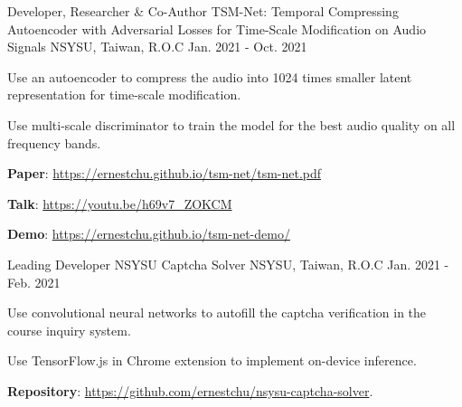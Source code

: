

\begin{cventries}

  \cventry
    {Developer, Researcher \& Co-Author} %
    {TSM-Net: Temporal Compressing Autoencoder with Adversarial Losses for Time-Scale Modification on Audio Signals} %
    {NSYSU, Taiwan, R.O.C} %
    {Jan. 2021 - Oct. 2021} %
    {
      \begin{cvitems} %
        \item {Use an autoencoder to compress the audio into 1024 times smaller latent representation for time-scale modification.}
        \item {Use multi-scale discriminator to train the model for the best audio quality on all frequency bands.}
        \item {\textbf{Paper}: \href{https://ernestchu.github.io/tsm-net/tsm-net.pdf}{https://ernestchu.github.io/tsm-net/tsm-net.pdf}}
        \item {\textbf{Talk}: \href{https://youtu.be/h69v7\_ZOKCM}{https://youtu.be/h69v7\_ZOKCM}}
        \item {\textbf{Demo}: \href{https://ernestchu.github.io/tsm-net-demo/}{https://ernestchu.github.io/tsm-net-demo/}}
      \end{cvitems}
    }

  \cventry
    {Leading Developer} %
    {NSYSU Captcha Solver} %
    {NSYSU, Taiwan, R.O.C} %
    {Jan. 2021 - Feb. 2021} %
    {
      \begin{cvitems} %
        \item {Use convolutional neural networks to autofill the captcha verification in the course inquiry system.}
        \item {Use TensorFlow.js in Chrome extension to implement on-device inference.}
        \item {\textbf{Repository}: \href{https://github.com/ernestchu/nsysu-captcha-solver}{https://github.com/ernestchu/nsysu-captcha-solver}.}
      \end{cvitems}
    }


\end{cventries}
